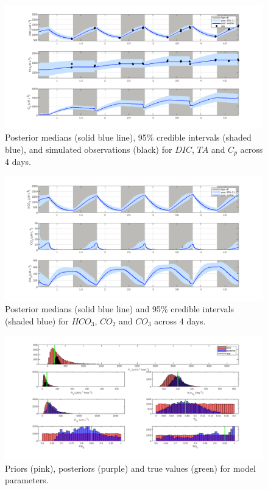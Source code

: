 \documentclass{ruthesis}
\begin{document}
\begin{figure}
	\centerline{\includegraphics[width=1.2\textwidth]{images_microalgae/posterior_plots_with_fake_data/DIC_TA_Cp}}
	\caption[.]{Posterior medians (solid blue line), 95\% credible intervals (shaded blue), and simulated observations (black) for $DIC$, $TA$ and $C_p$ across 4 days.}
	\label{fig:pos_sim_DIC_TA_Cp}
\end{figure}

\begin{figure}
	\centerline{\includegraphics[width=1.2\textwidth]{images_microalgae/posterior_plots_with_fake_data/carbon}}
	\caption[.]{Posterior medians (solid blue line) and 95\% credible intervals (shaded blue) for $HCO_3$, $CO_2$ and $CO_3$ across 4 days.}
	\label{fig:pos_sim_carbon}
\end{figure}


\begin{figure}
	\centerline{\includegraphics[width=1.3\textwidth]{images_microalgae/posterior_plots_with_fake_data/model_parameters}}
	\caption[.]{Priors (pink), posteriors (purple) and true values (green) for model parameters.}
	\label{fig:pos_sim_model_parameters}
\end{figure}
\end{document}
